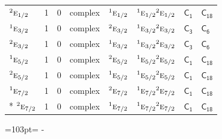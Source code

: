 \documentclass[10pt,a4paper]{article}
\newcommand{\needspace}[1]{\par\penalty-100\begingroup\dimen0=#1\relax\dimen2=\pagegoal
  \advance\dimen2-\pagetotal\ifdim\dimen0>\dimen2\relax\ifdim\dimen2>0pt\vfil\break\fi\fi
  \endgroup}
\numberwithin{equation}{section}
\newcommand{\grp}[1]{\mathsf{#1}}
\newcommand{\irr}[1]{\text{\normalfont\scshape #1}}
\newcommand{\conjpair}[1]{{}^{#1}}
\begin{document}
{\begin{longtable}{@{}lrrlllll@{}}
$\conjpair{2}\irr{e}_{1/2}$ & 1 & $0$ & complex & $\conjpair{1}\irr{e}_{1/2}$ & $\conjpair{1}\irr{e}_{1/2}\conjpair{2}\irr{e}_{1/2}$ & \href{C1.pdf}{$\grp{C_{1}}$} & $\grp{C_{18}}$\\
$\conjpair{1}\irr{e}_{3/2}$ & 1 & $0$ & complex & $\conjpair{2}\irr{e}_{3/2}$ & $\conjpair{1}\irr{e}_{3/2}\conjpair{2}\irr{e}_{3/2}$ & \href{C3.pdf}{$\grp{C_{3}}$} & \href{../../../rotation/data/pdf/C6.pdf}{$\grp{C_{6}}$}\\
$\conjpair{2}\irr{e}_{3/2}$ & 1 & $0$ & complex & $\conjpair{1}\irr{e}_{3/2}$ & $\conjpair{1}\irr{e}_{3/2}\conjpair{2}\irr{e}_{3/2}$ & \href{C3.pdf}{$\grp{C_{3}}$} & \href{../../../rotation/data/pdf/C6.pdf}{$\grp{C_{6}}$}\\
$\conjpair{1}\irr{e}_{5/2}$ & 1 & $0$ & complex & $\conjpair{2}\irr{e}_{5/2}$ & $\conjpair{1}\irr{e}_{5/2}\conjpair{2}\irr{e}_{5/2}$ & \href{C1.pdf}{$\grp{C_{1}}$} & $\grp{C_{18}}$\\
$\conjpair{2}\irr{e}_{5/2}$ & 1 & $0$ & complex & $\conjpair{1}\irr{e}_{5/2}$ & $\conjpair{1}\irr{e}_{5/2}\conjpair{2}\irr{e}_{5/2}$ & \href{C1.pdf}{$\grp{C_{1}}$} & $\grp{C_{18}}$\\
$\conjpair{1}\irr{e}_{7/2}$ & 1 & $0$ & complex & $\conjpair{2}\irr{e}_{7/2}$ & $\conjpair{1}\irr{e}_{7/2}\conjpair{2}\irr{e}_{7/2}$ & \href{C1.pdf}{$\grp{C_{1}}$} & $\grp{C_{18}}$\\*
$\conjpair{2}\irr{e}_{7/2}$ & 1 & $0$ & complex & $\conjpair{1}\irr{e}_{7/2}$ & $\conjpair{1}\irr{e}_{7/2}\conjpair{2}\irr{e}_{7/2}$ & \href{C1.pdf}{$\grp{C_{1}}$} & $\grp{C_{18}}$\\
\bottomrule\end{longtable}}
\needspace{103pt}
\end{document}
